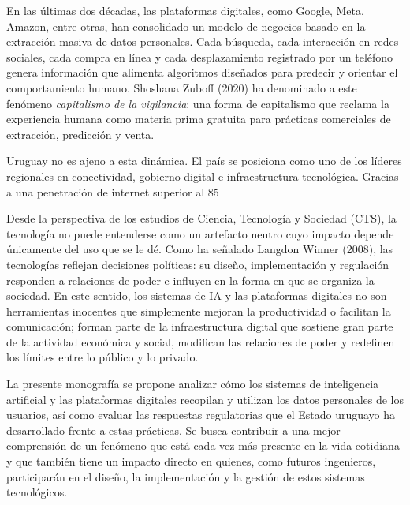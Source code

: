 \documentclass[11pt,a4paper]{article}
\begin{document}
En las últimas dos décadas, las plataformas digitales, como Google, Meta, Amazon, entre otras, han consolidado un modelo de negocios basado en la extracción masiva de datos personales. Cada búsqueda, cada interacción en redes sociales, cada compra en línea y cada desplazamiento registrado por un teléfono genera información que alimenta algoritmos diseñados para predecir y orientar el comportamiento humano. Shoshana Zuboff (2020) ha denominado a este fenómeno \textit{capitalismo de la vigilancia}: una forma de capitalismo que reclama la experiencia humana como materia prima gratuita para prácticas comerciales de extracción, predicción y venta.

Uruguay no es ajeno a esta dinámica. El país se posiciona como uno de los líderes regionales en conectividad, gobierno digital e infraestructura tecnológica. Gracias a una penetración de internet superior al 85%

Desde la perspectiva de los estudios de Ciencia, Tecnología y Sociedad (CTS), la tecnología no puede entenderse como un artefacto neutro cuyo impacto depende únicamente del uso que se le dé. Como ha señalado Langdon Winner (2008), las tecnologías reflejan decisiones políticas: su diseño, implementación y regulación responden a relaciones de poder e influyen en la forma en que se organiza la sociedad. En este sentido, los sistemas de IA y las plataformas digitales no son herramientas inocentes que simplemente mejoran la productividad o facilitan la comunicación; forman parte de la infraestructura digital que sostiene gran parte de la actividad económica y social, modifican las relaciones de poder y redefinen los límites entre lo público y lo privado.

La presente monografía se propone analizar cómo los sistemas de inteligencia artificial y las plataformas digitales recopilan y utilizan los datos personales de los usuarios, así como evaluar las respuestas regulatorias que el Estado uruguayo ha desarrollado frente a estas prácticas. Se busca contribuir a una mejor comprensión de un fenómeno que está cada vez más presente en la vida cotidiana y que también tiene un impacto directo en quienes, como futuros ingenieros, participarán en el diseño, la implementación y la gestión de estos sistemas tecnológicos.
\end{document}
